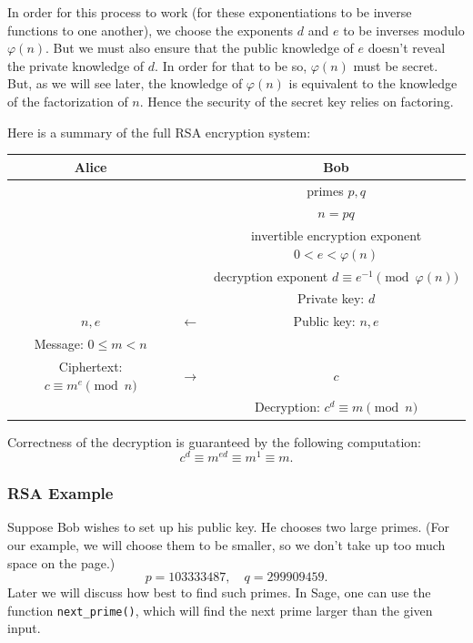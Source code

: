 \documentclass{article}
\theoremstyle{plain}
\theoremstyle{definition}
\theoremstyle{remark}
\numberwithin{theorem}{section}
\begin{document}
In order for this process to work (for these exponentiations to be inverse functions to one another), we choose the exponents $d$ and $e$ to be inverses modulo $\varphi(n)$.  But we must also ensure that the public knowledge of $e$ doesn't reveal the private knowledge of $d$.  In order for that to be so, $\varphi(n)$ must be secret.  But, as we will see later, the knowledge of $\varphi(n)$ is equivalent to the knowledge of the factorization of $n$.  Hence the security of the secret key relies on factoring.

Here is a summary of the full RSA encryption system:

     \begin{tabular}{ccc}
       Alice & & Bob \\
       \hline
        & &  primes $p, q$ \\
       & &  $n = pq$ \\
       & & invertible encryption exponent $0 < e < \varphi(n)$ \\ 
       & & decryption exponent $d \equiv e^{-1} \pmod{\varphi(n)}$ \\
       & & Private key: $d$ \\
       $n,e$ & $\longleftarrow$ & Public key: $n, e$ \\
       Message: $0 \le m < n$ & & \\
       Ciphertext: $c \equiv m^e \pmod{n}$ & $\longrightarrow$ & $c$ \\
					      & & Decryption: $c^d \equiv m \pmod{n}$ \\
      \end{tabular}
      \vspace{3em}
      

      Correctness of the decryption is guaranteed by the following computation:
      \[
	      c^d \equiv m^{ed} \equiv m^1 \equiv m.
      \]

\subsubsection{RSA Example}

Suppose Bob wishes to set up his public key.  He chooses two large primes.  (For our example, we will choose them to be smaller, so we don't take up too much space on the page.)
\[
p = 103333487,\quad q = 299909459.
\]
Later we will discuss how best to find such primes.  In Sage, one can use the function \texttt{next\_prime()}, which will find the next prime larger than the given input.
\end{document}
